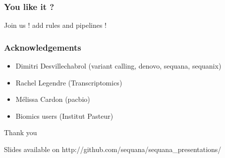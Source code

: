 \documentclass{beamer}
\begin{document}
\begin{frame}
\frametitle{You like it ? }
\centering
Join us ! add rules and pipelines !
\end{frame}



    
    



\begin{frame}
 \frametitle{Acknowledgements}

 \begin{itemize}
  \item Dimitri Desvillechabrol (variant calling, denovo, sequana, sequanix)
  \item Rachel Legendre (Transcriptomics)
  \item M\'elissa Cardon (pacbio)
  \item Biomics users (Institut Pasteur)
 \end{itemize}
 
\end{frame}


\begin{frame}
\centering
\vspace{2cm}
\LARGE
 Thank you 
 
 \vspace{2cm}
 
 \small
 Slides available on http://github.com/sequana/sequana\_presentations/
\end{frame}
\end{document}
